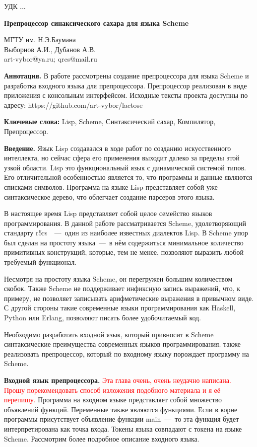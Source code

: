 \documentclass[12pt,a4paper,oneside]{extarticle}
\begin{document}
\noindent УДК ...
\bigskip

\noindent\textbf{Препроцессор синаксического сахара для языка Scheme}

\noindent МГТУ им. Н.Э.Баумана\\
Выборнов А.И., Дубанов А.В.\\
art-vybor@ya.ru; qrcs@mail.ru

\noindent\textbf{Аннотация.} В работе рассмотрены создание препроцессора для языка Scheme и разработка входного языка для препроцессора. Препроцессор реализован в виде приложения с консольным интерфейсом. Исходные тексты проекта доступны по адресу: https://github.com/art-vybor/lactose

\noindent\textbf{Ключевые слова:} Lisp, Scheme, Синтаксический сахар, Компилятор, Препроцессор.

\bigskip


\noindent\textbf{Введение.}
    Язык Lisp создавался в ходе работ по созданию искусственного интеллекта, но сейчас сфера его применения выходит далеко за пределы этой узкой области. Lisp это функциональный язык с динамической системой типов.
    Его отличительной особенностью является то, что программы и данные являются списками символов.
    Программа на языке Lisp представляет собой уже синтаксическое дерево, что облегчает создание парсеров этого языка.

    В настоящее время Lisp представляет собой целое семейство языков программирования.
    В данной работе рассматривается Scheme, удолетворяющий стандарту r5rs~\cite{r5rs}~---~один из наиболее известных диалектов Lisp.
    В Scheme упор был сделан на простоту языка~---~в нём содержиться минимальное количество примитивных конструкций, которые, тем не менее, позволяют выразить любой требуемый функционал.

    Несмотря на простоту языка Scheme, он перегружен большим количеством скобок.
    Также Scheme не поддерживает инфиксную запись выражений, что, к примеру, не позволяет записывать арифметические выражения в привычном виде.
    С другой стороны такие современные языки программирования как Haskell, Python или Erlang, позволяют писать более удобочитаемый код.

    Необходимо разработать входной язык, который привносит в Scheme синтаксические преимущества современных языков программирования.
    также реализовать препроцессор, который по входному языку порождает программу на Scheme.


\noindent\textbf{Входной язык препроцессора.} \textcolor{red}{Эта глава очень, очень неудачно написана. Прошу порекомендовать способ изложения подобного материала и я её перепишу.}
    Программа на входном языке представляет собой множество объявлений функций.
    Переменные также являются функциями.
    Если в корне программы присутствует объявление функции main~---~то эта функция будет интерпретирована как точка входа.
    Токены языка совпадают с токена на языке Sсheme. Рассмотрим более подробное описание входного языка.
\end{document}
